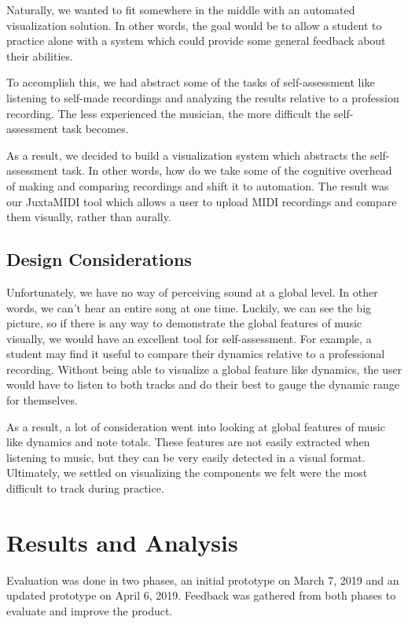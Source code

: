 \documentclass[journal]{vgtc}                %
\begin{document}
Naturally, we wanted to fit somewhere in the middle with an automated
visualization solution. In other words, the goal would be to allow a student to
practice alone with a system which could provide some general feedback about their
abilities.

To accomplish this, we had abstract some of the tasks of self-assessment like
listening to self-made recordings and analyzing the results relative to
a profession recording. The less experienced the musician, the more difficult
the self-assessment task becomes.

As a result, we decided to build a visualization system which abstracts the
self-assessment task. In other words, how do we take some of the cognitive
overhead of making and comparing recordings and shift it to automation. The
result was our JuxtaMIDI tool which allows a user to upload MIDI recordings
and compare them visually, rather than aurally.

\subsection{Design Considerations}

Unfortunately, we have no way of perceiving sound at a global level. In other
words, we can't hear an entire song at one time. Luckily, we can see the
big picture, so if there is any way to demonstrate the global features of
music visually, we would have an excellent tool for self-assessment. For
example, a student may find it useful to compare their dynamics relative
to a professional recording. Without being able to visualize a global
feature like dynamics, the user would have to listen to both tracks and do
their best to gauge the dynamic range for themselves.

As a result, a lot of consideration went into looking at global features of
music like dynamics and note totals. These features are not easily extracted
when listening to music, but they can be very easily detected in a visual
format. Ultimately, we settled on visualizing the components we felt were
the most difficult to track during practice.

\section{Results and Analysis}

Evaluation was done in two phases, an initial prototype on March 7, 2019 and an
updated prototype on April 6, 2019. Feedback was gathered from both phases to
evaluate and improve the product.
\end{document}
